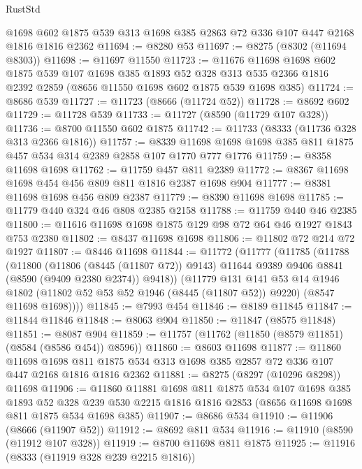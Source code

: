 \begin{lexlean}{RustStd}
\begin{coremodule}
    @1698
    @602
    @1875
    @539
    @313
    @1698
    @385
    @2863
    @72
    @336
    @107
    @447
    @2168
    @1816
    @1816
    @2362
@11694 := @8280 @53
@11697 := @8275 (@8302 (@11694 @8303))
@11698 := @11697 @11550
@11723 := @11676
    @11698
    @1698
    @602
    @1875
    @539
    @107
    @1698
    @385
    @1893
    @52
    @328
    @313
    @535
    @2366
    @1816
    @2392
    @2859
    (@8656 @11550 @1698 @602 @1875 @539 @1698 @385)
@11724 := @8686 @539
@11727 := @11723 (@8666 (@11724 @52))
@11728 := @8692 @602
@11729 := @11728 @539
@11733 := @11727 (@8590 (@11729 @107 @328))
@11736 := @8700 @11550 @602 @1875
@11742 := @11733 (@8333 (@11736 @328 @313 @2366 @1816))
@11757 := @8339 @11698 @1698 @1698 @385 @811 @1875 @457 @534 @314 @2389 @2858 @107 @1770 @777 @1776
@11759 := @8358 @11698 @1698
@11762 := @11759 @457 @811 @2389
@11772 := @8367 @11698 @1698 @454 @456 @809 @811 @1816 @2387 @1698 @904
@11777 := @8381 @11698 @1698 @456 @809 @2387
@11779 := @8390 @11698 @1698
@11785 := @11779 @440 @324 @46 @808 @2385 @2158
@11788 := @11759 @440 @46 @2385
@11800 := @11616 @11698 @1698 @1875 @129 @98 @72 @64 @46 @1927 @1843 @753 @2380
@11802 := @8437 @11698 @1698
@11806 := @11802 @72 @214 @72 @1927
@11807 := @8446 @11698
@11844 := @11772
    (@11777
      (@11785
        (@11788
          (@11800
            (@11806 (@8445 (@11807 @72)) @9143)
            @11644
            @9389
            @9406
            @8841
            (@8590 (@9409 @2380 @2374))
            @9418))
        (@11779
          @131
          @141
          @53
          @14
          @1946
          @1802
          (@11802 @52 @53 @52 @1946 (@8445 (@11807 @52)) @9220)
          (@8547 @11698 @1698))))
@11845 := @7993 @454
@11846 := @8189 @11845
@11847 := @11844 @11846
@11848 := @8063 @904
@11850 := @11847 (@8575 @11848)
@11851 := @8087 @904
@11859 := @11757 (@11762 (@11850 (@8579 @11851) (@8584 (@8586 @454)) @8596))
@11860 := @8603 @11698
@11877 := @11860
    @11698
    @1698
    @811
    @1875
    @534
    @313
    @1698
    @385
    @2857
    @72
    @336
    @107
    @447
    @2168
    @1816
    @1816
    @2362
@11881 := @8275 (@8297 (@10296 @8298)) @11698
@11906 := @11860
    @11881
    @1698
    @811
    @1875
    @534
    @107
    @1698
    @385
    @1893
    @52
    @328
    @239
    @530
    @2215
    @1816
    @1816
    @2853
    (@8656 @11698 @1698 @811 @1875 @534 @1698 @385)
@11907 := @8686 @534
@11910 := @11906 (@8666 (@11907 @52))
@11912 := @8692 @811 @534
@11916 := @11910 (@8590 (@11912 @107 @328))
@11919 := @8700 @11698 @811 @1875
@11925 := @11916 (@8333 (@11919 @328 @239 @2215 @1816))

\end{coremodule}
\end{lexlean}
